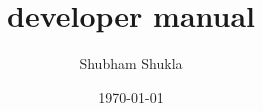\documentclass[11]{article}
\begin{document}
\title{developer manual}
\author{Shubham Shukla}
\date{\today}
\maketitle
\end{document}
